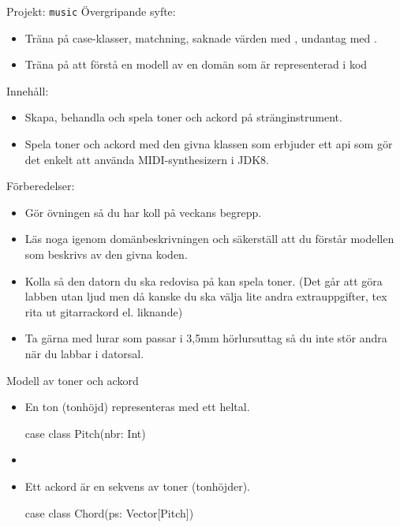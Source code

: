 
\begin{Slide}{Projekt: \texttt{music}}\SlideFontSmall
Övergripande syfte:
\begin{itemize}
\item Träna på case-klasser, matchning, saknade värden med , undantag med .
\item Träna på att förstå en modell av en domän som är representerad i kod
\end{itemize}

Innehåll:
\begin{itemize}
\item Skapa, behandla och spela toner och ackord på stränginstrument.
\item Spela toner och ackord med den givna klassen  som erbjuder ett api som gör det enkelt att använda MIDI-synthesizern i JDK8.
\end{itemize}

Förberedelser:
\begin{itemize}
  \item Gör övningen så du har koll på veckans begrepp.
  \item Läs noga igenom domänbeskrivningen och säkerställ att du förstår modellen som beskrivs av den givna koden.
  \item Kolla så den datorn du ska redovisa på kan spela toner. (Det går att göra labben utan ljud men då kanske du ska välja lite andra extrauppgifter, tex rita ut gitarrackord el. liknande)
  \item Ta gärna med lurar som passar i 3,5mm hörlursuttag så du inte stör andra när du labbar i datorsal.
\end{itemize}

\end{Slide}


\begin{Slide}{Modell av toner och ackord}

\begin{itemize}
\item En ton (tonhöjd) representeras med ett heltal.
\begin{Code}
case class Pitch(nbr: Int)
\end{Code}

\item[]

\item Ett ackord är en sekvens av toner (tonhöjder).
\begin{Code}
case class Chord(ps: Vector[Pitch])
\end{Code}
\end{itemize}

\end{Slide}


